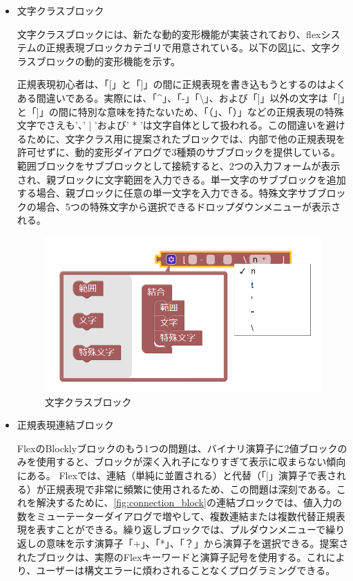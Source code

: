 \documentclass{risepaper}
\begin{document}
\begin{itemize}
\item 文字クラスブロック

文字クラスブロックには、新たな動的変形機能が実装されており、flexシステムの正規表現ブロックカテゴリで用意されている。以下の図\ref{fig:character_class_block}に、文字クラスブロックの動的変形機能を示す。

正規表現初心者は、「[」と「]」の間に正規表現を書き込もうとするのはよくある間違いである。実際には、「\textasciicircum」、「-」「\textbackslash 」、および「]」以外の文字は「[」と「]」の間に特別な意味を持たないため、「（」、「）」などの正規表現の特殊文字でさえも'、' | 'および' * 'は文字自体として扱われる。この間違いを避けるために、文字クラス用に提案されたブロックでは、内部で他の正規表現を許可せずに、動的変形ダイアログで3種類のサブブロックを提供している。範囲ブロックをサブブロックとして接続すると、2つの入力フォームが表示され、親ブロックに文字範囲を入力できる。単一文字のサブブロックを追加する場合、親ブロックに任意の単一文字を入力できる。特殊文字サブブロックの場合、5つの特殊文字から選択できるドロップダウンメニューが表示される。

\begin{figure}[h]
\begin{center}
\includegraphics[scale=0.8]{img/character_class_block.png}
\caption{文字クラスブロック}%
\label{fig:character_class_block}
\end{center}%
\end{figure}%

\item 正規表現連結ブロック

FlexのBlocklyブロックのもう1つの問題は、バイナリ演算子に2値ブロックのみを使用すると、ブロックが深く入れ子になりすぎて表示に収まらない傾向にある。 Flexでは、連結（単純に並置される）と代替（「|」演算子で表される）が正規表現で非常に頻繁に使用されるため、この問題は深刻である。これを解決するために、\ref{fig:connection_block}の連結ブロックでは、値入力の数をミューテーターダイアログで増やして、複数連結または複数代替正規表現を表すことができる。繰り返しブロックでは、プルダウンメニューで繰り返しの意味を示す演算子「+」、「*」、「？」から演算子を選択できる。提案されたブロックは、実際のFlexキーワードと演算子記号を使用する。これにより、ユーザーは構文エラーに煩わされることなくプログラミングできる。


\end{itemize}
\end{document}
